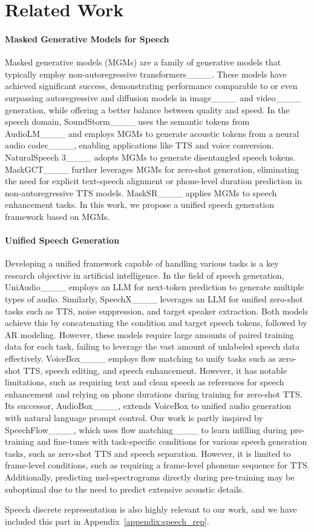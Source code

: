 \section{Related Work}
\paragraph{Masked Generative Models for Speech} Masked generative models (MGMs) are a family of generative models that typically employ non-autoregressive transformers____. These models have achieved significant success, demonstrating performance comparable to or even surpassing autoregressive and diffusion models in image____ and video____ generation, while offering a better balance between quality and speed.
In the speech domain, SoundStorm____ uses the semantic tokens from AudioLM____ and employs MGMs to generate acoustic tokens from a neural audio codec____, enabling applications like TTS and voice conversion. NaturalSpeech 3____ adopts MGMs to generate disentangled speech tokens. MaskGCT____ further leverages MGMs for zero-shot generation, eliminating the need for explicit text-speech alignment or phone-level duration prediction in non-autoregressive TTS models. MaskSR____ applies MGMs to speech enhancement tasks. In this work, we propose a unified speech generation framework based on MGMs.


\paragraph{Unified Speech Generation} Developing a unified framework capable of handling various tasks is a key research objective in artificial intelligence. In the field of speech generation, UniAudio____ employs an LLM for next-token prediction to generate multiple types of audio. Similarly, SpeechX____ leverages an LLM for unified zero-shot tasks such as TTS, noise suppression, and target speaker extraction. Both models achieve this by concatenating the condition and target speech tokens, followed by AR modeling.
However, these models require large amounts of paired training data for each task, failing to leverage the vast amount of unlabeled speech data effectively. VoiceBox____ employs flow matching to unify tasks such as zero-shot TTS, speech editing, and speech enhancement. However, it has notable limitations, such as requiring text and clean speech as references for speech enhancement and relying on phone durations during training for zero-shot TTS. Its successor, AudioBox____, extends VoiceBox to unified audio generation with natural language prompt control. Our work is partly inspired by SpeechFlow____, which uses flow matching____ to learn infilling during pre-training and fine-tunes with task-specific conditions for various speech generation tasks, such as zero-shot TTS and speech separation. However, it is limited to frame-level conditions, such as requiring a frame-level phoneme sequence for TTS. Additionally, predicting mel-spectrograms directly during pre-training may be suboptimal due to the need to predict extensive acoustic details.

Speech discrete representation is also highly relevant to our work, and we have included this part in Appendix~\ref{appendix:speech_rep}.